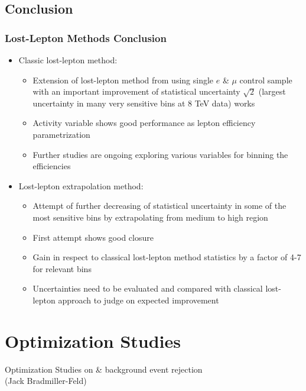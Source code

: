 \documentclass{beamer}
\begin{document}
\subsection{Conclusion}
\begin{frame}
 \frametitle{Lost-Lepton Methods Conclusion}
 \begin{itemize}
 \item Classic lost-lepton method:
 \begin{itemize}
  \item Extension of lost-lepton method from using single $e$ \& $\mu$ control sample with an important improvement of statistical uncertainty $\sqrt{2}$ (largest uncertainty in many very sensitive bins at 8 TeV data) works
  \item Activity variable shows good performance as lepton efficiency parametrization
  \item Further studies are ongoing exploring various variables for binning the efficiencies
 \end{itemize}
 \item Lost-lepton extrapolation method:
 \begin{itemize}
  \item Attempt of further decreasing of statistical uncertainty in some of the most sensitive bins by extrapolating from medium to high \MHT region
  \item First attempt shows good closure
  \item Gain in respect to classical lost-lepton method statistics by a factor of 4-7 for relevant bins
  \item Uncertainties need to be evaluated and compared with classical lost-lepton approach to judge on expected improvement
 \end{itemize}

 \end{itemize}

\end{frame}


\section{Optimization Studies}
  \begin{frame}
  \begin{center}
    {
     \large Optimization Studies on \ttbar \& \wpj background event rejection \\(Jack Bradmiller-Feld)}
  \end{center}
\end{frame}
\end{document}
